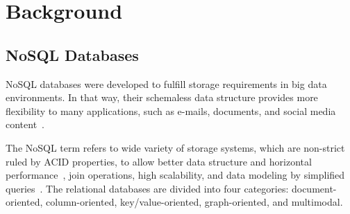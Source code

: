 \documentclass{svproc}
\begin{document}
\section{Background}
\label{section:fundamentacao}


\subsection{NoSQL Databases}
\label{subsection:nao-relacional}


NoSQL databases were developed to fulfill storage requirements in big data environments. In that way, their schemaless data structure provides more flexibility to many applications, such as e-mails, documents, and social media content~\cite{mohamed:2014,ramesh:2016}.

The NoSQL term refers to wide variety of storage systems, which are non-strict ruled by ACID properties, to allow better data structure and horizontal performance~\cite{rafique:2018}, join operations, high scalability, and data modeling by simplified queries~\cite{ramesh:2016}.
The relational databases are divided into four categories: document-oriented, column-oriented, key/value-oriented, graph-oriented, and multimodal.

\end{document}
